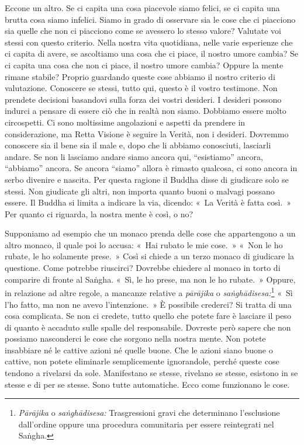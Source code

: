 Eccone un altro. Se ci capita una cosa piacevole siamo felici, se ci
capita una brutta cosa siamo infelici. Siamo in grado di osservare sia
le cose che ci piacciono sia quelle che non ci piacciono come se
avessero lo stesso valore? Valutate voi stessi con questo criterio.
Nella nostra vita quotidiana, nelle varie esperienze che ci capita di
avere, se ascoltiamo una cosa che ci piace, il nostro umore cambia? Se
ci capita una cosa che non ci piace, il nostro umore cambia? Oppure la
mente rimane stabile? Proprio guardando queste cose abbiamo il nostro
criterio di valutazione. Conoscere se stessi, tutto qui, questo è il
vostro testimone. Non prendete decisioni basandovi sulla forza dei
vostri desideri. I desideri possono indurci a pensare di essere ciò che
in realtà non siamo. Dobbiamo essere molto circospetti. Ci sono
moltissime angolazioni e aspetti da prendere in considerazione, ma Retta
Visione è seguire la Verità, non i desideri. Dovremmo conoscere sia il
bene sia il male e, dopo che li abbiamo conosciuti, lasciarli andare. Se
non li lasciamo andare siamo ancora qui, ``esistiamo'' ancora,
``abbiamo'' ancora. Se ancora ``siamo'' allora è rimasto qualcosa, ci
sono ancora in serbo divenire e nascita. Per questa ragione il Buddha
disse di giudicare solo se stessi. Non giudicate gli altri, non importa
quanto buoni o malvagi possano essere. Il Buddha si limita a indicare la
via, dicendo: «~La Verità è fatta così.~» Per quanto ci riguarda, la
nostra mente è così, o no?

Supponiamo ad esempio che un monaco prenda delle cose che appartengono a
un altro monaco, il quale poi lo accusa: «~Hai rubato le mie cose.~»
«~Non le ho rubate, le ho solamente prese.~» Così si chiede a un terzo
monaco di giudicare la questione. Come potrebbe riuscirci? Dovrebbe
chiedere al monaco in torto di comparire di fronte al Saṅgha. «~Sì, le
ho prese, ma non le ho rubate.~» Oppure, in relazione ad altre regole, a
mancanze relative a \emph{pārājika} o \emph{saṅghādisesa:}\footnote{\emph{Pārājika}
  o \emph{saṅghādisesa:} Trasgressioni gravi che determinano
  l'esclusione dall'ordine oppure una procedura comunitaria per essere
  reintegrati nel Saṅgha.} «~Sì l'ho fatto, ma non ne avevo
l'intenzione.~» È possibile crederci? Si tratta di una cosa complicata.
Se non ci credete, tutto quello che potete fare è lasciare il peso di
quanto è accaduto sulle spalle del responsabile. Dovreste però sapere
che non possiamo nasconderci le cose che sorgono nella nostra mente. Non
potete insabbiare né le cattive azioni né quelle buone. Che le azioni
siano buone o cattive, non potete eliminarle semplicemente ignorandole,
perché queste cose tendono a rivelarsi da sole. Manifestano se stesse,
rivelano se stesse, esistono in se stesse e di per se stesse. Sono tutte
automatiche. Ecco come funzionano le cose.

